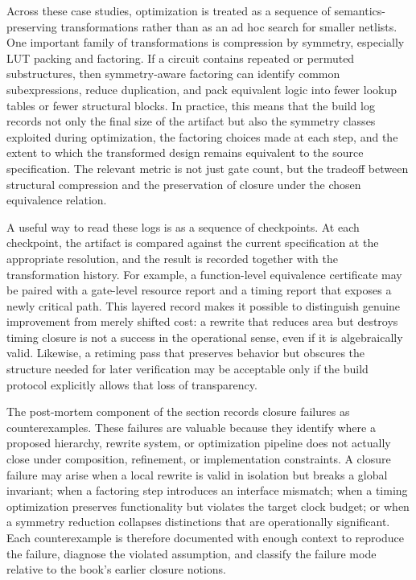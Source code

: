 \documentclass[11pt]{article}
\begin{document}
Across these case studies, optimization is treated as a sequence of semantics-preserving transformations rather than as an ad hoc search for smaller netlists. One important family of transformations is compression by symmetry, especially LUT packing and factoring. If a circuit contains repeated or permuted substructures, then symmetry-aware factoring can identify common subexpressions, reduce duplication, and pack equivalent logic into fewer lookup tables or fewer structural blocks. In practice, this means that the build log records not only the final size of the artifact but also the symmetry classes exploited during optimization, the factoring choices made at each step, and the extent to which the transformed design remains equivalent to the source specification. The relevant metric is not just gate count, but the tradeoff between structural compression and the preservation of closure under the chosen equivalence relation.

A useful way to read these logs is as a sequence of checkpoints. At each checkpoint, the artifact is compared against the current specification at the appropriate resolution, and the result is recorded together with the transformation history. For example, a function-level equivalence certificate may be paired with a gate-level resource report and a timing report that exposes a newly critical path. This layered record makes it possible to distinguish genuine improvement from merely shifted cost: a rewrite that reduces area but destroys timing closure is not a success in the operational sense, even if it is algebraically valid. Likewise, a retiming pass that preserves behavior but obscures the structure needed for later verification may be acceptable only if the build protocol explicitly allows that loss of transparency.

The post-mortem component of the section records closure failures as counterexamples. These failures are valuable because they identify where a proposed hierarchy, rewrite system, or optimization pipeline does not actually close under composition, refinement, or implementation constraints. A closure failure may arise when a local rewrite is valid in isolation but breaks a global invariant; when a factoring step introduces an interface mismatch; when a timing optimization preserves functionality but violates the target clock budget; or when a symmetry reduction collapses distinctions that are operationally significant. Each counterexample is therefore documented with enough context to reproduce the failure, diagnose the violated assumption, and classify the failure mode relative to the book's earlier closure notions.
\end{document}
